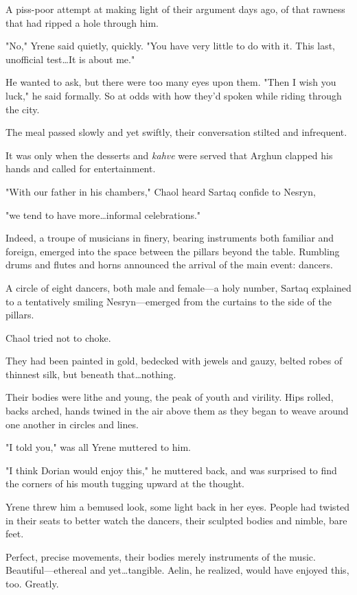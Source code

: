 A piss-poor attempt at making light of their argument days ago, of that rawness that had ripped a hole through him.

"No," Yrene said quietly, quickly.
"You have very little to do with it.
This last, unofficial test\ldots It is about me."

He wanted to ask, but there were too many eyes upon them.
"Then I wish you luck," he said formally.
So at odds with how they'd spoken while riding through the city.

The meal passed slowly and yet swiftly, their conversation stilted and infrequent.

It was only when the desserts and \emph{kahve} were served that Arghun clapped his hands and called for entertainment.

"With our father in his chambers," Chaol heard Sartaq confide to Nesryn,

"we tend to have more\ldots informal celebrations."

Indeed, a troupe of musicians in finery, bearing instruments both familiar and foreign, emerged into the space between the pillars beyond the table.
Rumbling drums and flutes and horns announced the arrival of the main event: dancers.

A circle of eight dancers, both male and female---a holy number, Sartaq explained to a tentatively smiling Nesryn---emerged from the curtains to the side of the pillars.

Chaol tried not to choke.

They had been painted in gold, bedecked with jewels and gauzy, belted robes of thinnest silk, but beneath that\ldots nothing.

Their bodies were lithe and young, the peak of youth and virility.
Hips rolled, backs arched, hands twined in the air above them as they began to weave around one another in circles and lines.

"I told you," was all Yrene muttered to him.

"I think Dorian would enjoy this," he muttered back, and was surprised to find the corners of his mouth tugging upward at the thought.

Yrene threw him a bemused look, some light back in her eyes.
People had twisted in their seats to better watch the dancers, their sculpted bodies and nimble, bare feet.

Perfect, precise movements, their bodies merely instruments of the music.
Beautiful---ethereal and yet\ldots tangible.
Aelin, he realized, would have enjoyed this, too.
Greatly.

